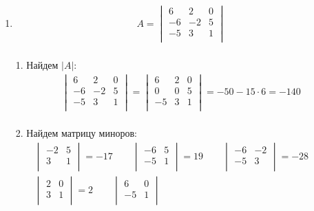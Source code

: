 \begin{enumerate}
		
		\item
			\begin{gather*}
				A = 
				\begin{vmatrix}
					6 & 2 & 0\\
					-6 & -2 & 5\\
					-5 & 3 & 1\\
				\end{vmatrix}
			\end{gather*} 
			\\
			1. Найдем $|A|$:
			\begin{gather*}
				\begin{vmatrix}
					6 & 2 & 0\\
					-6 & -2 & 5\\
					-5 & 3 & 1\\
				\end{vmatrix}
				=
				\begin{vmatrix}
					6 & 2 & 0\\
					0 & 0 & 5\\
					-5 & 3 & 1\\
				\end{vmatrix}
				 = -50 - 15 \cdot 6 = -140
			\end{gather*}
			\\
			2. Найдем матрицу миноров: 
			\begin{gather*}
				\begin{vmatrix}
					-2 & 5\\
					3 & 1\\
				\end{vmatrix}
				= -17\qquad
				\begin{vmatrix}
					-6 & 5\\
					-5 & 1\\
				\end{vmatrix}
				= 19\qquad
				\begin{vmatrix}
					-6 & -2\\
					-5 & 3\\
				\end{vmatrix}
				= -28\qquad
				\\
				\begin{vmatrix}
					2 & 0\\
					3 & 1\\
				\end{vmatrix}
				= 2\qquad
				\begin{vmatrix}
					6 & 0\\
					-5 & 1\\
				\end{vmatrix}

\end{gather*}
\end{enumerate}
